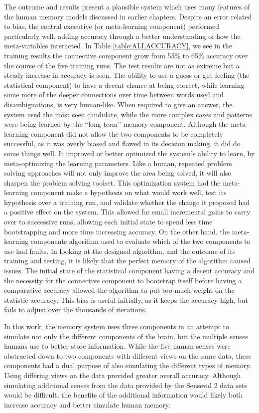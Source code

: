 The outcome and results present a plausible system which uses many features of the human memory
models discussed in earlier chapters. Despite an error related to bias, the central executive (or 
meta-learning component) performed particularly well, adding accuracy through a better understanding 
of how the meta-variables interacted.  In Table \ref{table:ALLACCURACY}, we see in
the training results the connective component grow from 55\% to 65\% accuracy
over the course of the five training runs. The test results are not as extreme
but a steady increase in accuracy is seen.  The ability to use a guess or gut
feeling (the statistical component) to have a decent chance at being correct,
while learning some more of the deeper connections over time between words used
and disambiguations, is very human-like.  When required to give an answer, the
system used the most seen candidate, while the more complex cases and patterns
were being learned by the ``long term'' memory component.  Although the meta-learning 
component did not allow the two components to be completely successful,
as it was overly biased and flawed in its decision making, it did do some things
well. It improved or better optimized the system's ability to learn, by meta-optimizing 
the learning parameters. Like a human, repeated problem solving
approaches will not only improve the area being solved, it will also sharpen the
problem solving toolset. This optimization system had the meta-learning
component make a hypothesis on what would work well, test its hypothesis over a
training run, and validate whether the change it proposed had a positive effect
on the system. This allowed for small incremental gains to carry over to
successive runs, allowing each initial state to spend less time bootstrapping
and more time increasing accuracy. On the other hand, the meta-learning
components algorithm used to evaluate which of the two components to use had
faults.  In looking at the designed algorithm, and the outcome of its training
and testing, it is likely that the perfect memory of the algorithm caused issues.
The initial state of the statistical component having a decent accuracy and the
necessity for the connective component to bootstrap itself before having a
comparative accuracy allowed the algorithm to put too much weight on the
statistic accuracy.  This bias is useful initially, as it keeps the accuracy
high, but fails to adjust over the thousands of iterations.

In this work, the memory system uses three components in an attempt to simulate
not only the different components of the brain, but the multiple senses humans
use to better store information. While the five human senses were abstracted
down to two components with different views on the same data, these components
had a dual purpose of also simulating the different types of memory. 
Using differing views on the data provided greater overall
accuracy. Although simulating additional senses from the data provided by the
Senseval 2 data sets would be difficult, the benefits of the additional
information would likely both increase accuracy and better simulate human
memory.

